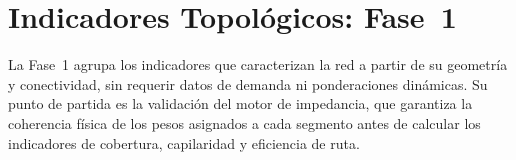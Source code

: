 \section{Indicadores Topológicos: Fase~1}
\label{sec:fase1-indicadores}

La Fase~1 agrupa los indicadores que caracterizan la red a partir de su
geometría y conectividad, sin requerir datos de demanda ni ponderaciones
dinámicas. Su punto de partida es la validación del motor de impedancia, que
garantiza la coherencia física de los pesos asignados a cada segmento antes de
calcular los indicadores de cobertura, capilaridad y eficiencia de ruta.





